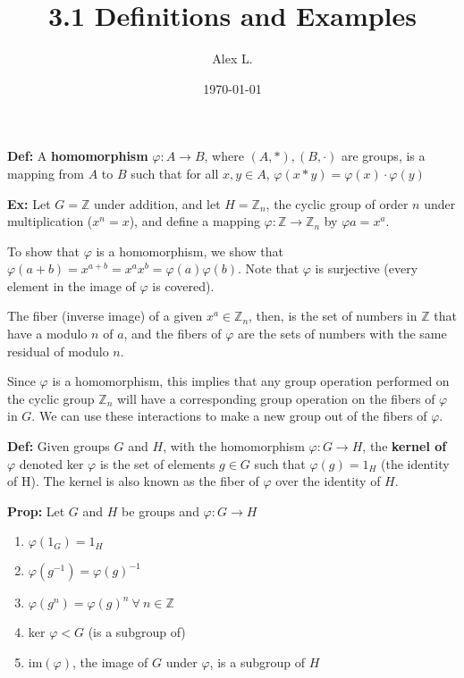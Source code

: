 \documentclass{article}
\title{3.1 Definitions and Examples}
\author{Alex L.}
\date{\today}
\begin{document}
\maketitle

\textbf{Def:} A \textbf{homomorphism} $\varphi : A \rightarrow B$, where $(A, *), (B, \cdot)$ are groups, is a mapping from $A$ to $B$ such that for all $x,y \in A$, $\varphi (x * y) = \varphi (x) \cdot \varphi(y)$

\textbf{Ex:} Let $G = \mathbb{Z}$ under addition, and let $H = \mathbb{Z}_n$, the cyclic group of order $n$ under multiplication ($x^n = x$), and define a mapping $\varphi: \mathbb{Z} \rightarrow \mathbb{Z}_n$ by $\varphi a = x^a$.

To show that $\varphi$ is a homomorphism, we show that $\varphi (a+b) = x^{a+b} = x^a x^b = \varphi(a) \varphi (b)$. Note that $\varphi$ is surjective (every element in the image of $\varphi$ is covered).

The fiber (inverse image) of a given $x^a \in \mathbb{Z}_n$, then, is the set of numbers in $\mathbb{Z}$ that have a modulo $n$ of $a$, and the fibers of $\varphi$ are the sets of numbers with the same residual of modulo $n$.

Since $\varphi$ is a homomorphism, this implies that any group operation performed on the cyclic group $\mathbb{Z}_n$ will have a corresponding group operation on the fibers of $\varphi$ in $G$. We can use these interactions to make a new group out of the fibers of $\varphi$.

\textbf{Def:} Given groups $G$ and $H$, with the homomorphism $\varphi: G \rightarrow H$, the \textbf{kernel of $\varphi$} denoted ker $\varphi$ is the set of elements $g \in G$ such that $\varphi (g) = 1_H$ (the identity of H). The kernel is also known as the fiber of $\varphi$ over the identity of $H$.

\textbf{Prop:} 
Let $G$ and $H$ be groups and $\varphi: G \rightarrow H$
\begin{enumerate}
    \item $\varphi(1_G) = 1_H$
    \item $\varphi(g^{-1}) = \varphi(g)^{-1}$
    \item $\varphi (g^n) = \varphi(g)^n \: \forall \: n \in \mathbb{Z}$
    \item ker $\varphi < G$ (is a subgroup of)
    \item im$(\varphi)$, the image of $G$ under $\varphi$, is a subgroup of $H$
\end{enumerate}
\end{document}
